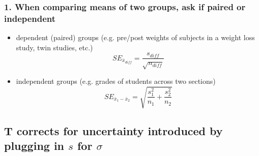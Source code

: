 \documentclass[slidestop,compress,mathserif,12pt,t,professionalfonts,xcolor=table]{beamer}
\begin{document}
\begin{frame}
\frametitle{1. When comparing means of two groups, ask if paired or independent}

\begin{itemize}

\item dependent (paired) groups (e.g. pre/post weights of subjects in a weight loss study, twin studies, etc.)
\[ SE_{\bar{x}_{diff}} = \frac{s_{diff}}{\sqrt{n_{diff}}} \]

\item independent groups (e.g. grades of students across two sections)
\[ SE_{\bar{x}_1 - \bar{x}_2} = \sqrt{ \frac{s_1^2}{n_1} + \frac{s_2^2}{n_2} } \]

\end{itemize}


\end{frame}


\subsection{T corrects for uncertainty introduced by plugging in $s$ for $\sigma$}
\label{mi2}

\end{document}
